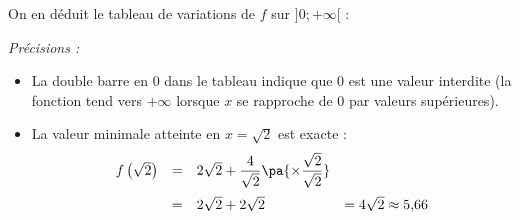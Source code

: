\begin{ex}
\begin{enumerate}
		      On en déduit le tableau de variations de $f$ sur $]0; +\infty[$ :

		      \begin{center}
		      \end{center}

		      \emph{Précisions :}
		      \begin{itemize}
			      \item La double barre en $0$ dans le tableau indique que $0$ est une valeur interdite (la fonction tend vers $+\infty$ lorsque $x$ se rapproche de $0$ par valeurs supérieures).
			      \item La valeur minimale atteinte en $x = \sqrt{2}$ est exacte :
			            \[
				            \def\arraystretch{1.8}
				            \begin{array}{rcll}
					            f\left(\sqrt{2}\right) & = & 2\sqrt{2} + \dfrac{4}{\sqrt{2}}\pa{\times\dfrac{\sqrt{2}}{\sqrt{2}}} &                             \\
					                                   & = & 2\sqrt{2} + 2\sqrt{2}                                                & =  4\sqrt{2} \approx 5{,}66
				            \end{array}
			            \]
		      \end{itemize}


\end{enumerate}
\end{ex}
